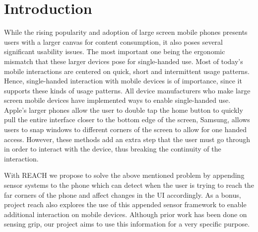 \section{Introduction}
While the rising popularity and adoption of large screen mobile phones presents users with a larger canvas for content consumption, it also poses several significant usability issues. The most important one being the ergonomic mismatch that these larger devices pose for single-handed use. Most of today's mobile interactions are centered on quick, short and intermittent usage patterns. Hence, single-handed interaction with mobile devices is of importance, since it supports these kinds of usage patterns. All device manufacturers who make large screen mobile devices have implemented ways to enable single-handed use. Apple's larger phones allow the user to double tap the home button to quickly pull the entire interface closer to the bottom edge of the screen, Samsung, allows users to snap windows to different corners of the screen to allow for one handed access. However, these methods add an extra step that the user must go through in order to interact with the device, thus breaking the continuity of the interaction.
\par
With REACH we propose to solve the above mentioned problem by appending sensor systems to the phone which can detect when the user is trying to reach the far corners of the phone and affect changes in the UI accordingly. As a bonus, project reach also explores the use of this appended sensor framework to enable additional interaction on mobile devices. Although prior work has been done on sensing grip, our project aims to use this information for a very specific purpose. 